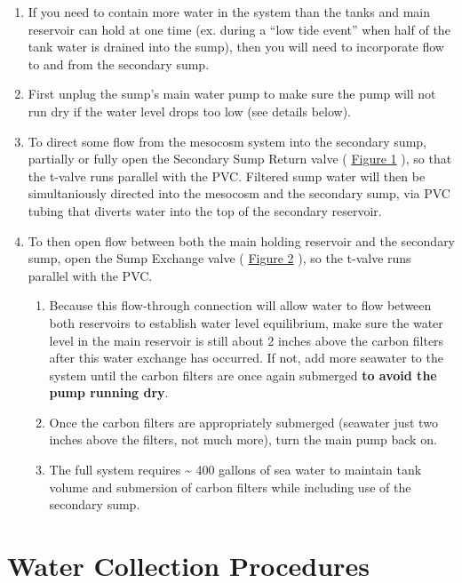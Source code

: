 \documentclass[
]{book}
\providecommand{\tightlist}{%
  \setlength{\itemsep}{0pt}\setlength{\parskip}{0pt}}
\begin{document}
\begin{enumerate}
\def\labelenumi{\arabic{enumi}.}
\tightlist
\item
  If you need to contain more water in the system than the tanks and main reservoir can hold at one time (ex. during a ``low tide event'' when half of the tank water is drained into the sump), then you will need to incorporate flow to and from the secondary sump.
\item
  First unplug the sump's main water pump to make sure the pump will not run dry if the water level drops too low (see details below).
\item
  To direct some flow from the mesocosm system into the secondary sump, partially or fully open the Secondary Sump Return valve ( \protect\hyperlink{Figure1}{Figure 1} ), so that the t-valve runs parallel with the PVC. Filtered sump water will then be simultaniously directed into the mesocosm and the secondary sump, via PVC tubing that diverts water into the top of the secondary reservoir.
\item
  To then open flow between both the main holding reservoir and the secondary sump, open the Sump Exchange valve ( \protect\hyperlink{Figure2}{Figure 2} ), so the t-valve runs parallel with the PVC.

  \begin{enumerate}
  \def\labelenumii{\arabic{enumii}.}
  \tightlist
  \item
    Because this flow-through connection will allow water to flow between both reservoirs to establish water level equilibrium, make sure the water level in the main reservoir is still about 2 inches above the carbon filters after this water exchange has occurred. If not, add more seawater to the system until the carbon filters are once again submerged \textbf{to avoid the pump running dry}.
  \item
    Once the carbon filters are appropriately submerged (seawater just two inches above the filters, not much more), turn the main pump back on.
  \item
    The full system requires \textasciitilde{} 400 gallons of sea water to maintain tank volume and submersion of carbon filters while including use of the secondary sump.
  \end{enumerate}
\end{enumerate}

\hypertarget{water-collection-procedures}{%
\chapter{Water Collection Procedures}\label{water-collection-procedures}}
\end{document}
